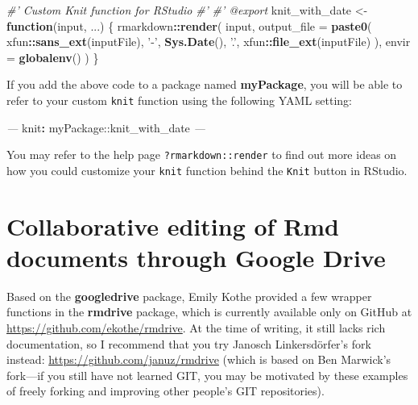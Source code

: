 \documentclass[
  11pt,
]{krantz}
\newenvironment{Shaded}{\begin{snugshade}}{\end{snugshade}}
\newcommand{\AttributeTok}[1]{\textcolor[rgb]{0.61,0.61,0.61}{#1}}
\newcommand{\CommentTok}[1]{\textcolor[rgb]{0.37,0.37,0.37}{\textit{#1}}}
\newcommand{\ControlFlowTok}[1]{\textcolor[rgb]{0.27,0.27,0.27}{\textbf{#1}}}
\newcommand{\DataTypeTok}[1]{\textcolor[rgb]{0.27,0.27,0.27}{#1}}
\newcommand{\FunctionTok}[1]{\textcolor[rgb]{0,0,0}{#1}}
\newcommand{\KeywordTok}[1]{\textcolor[rgb]{0.27,0.27,0.27}{\textbf{#1}}}
\newcommand{\NormalTok}[1]{#1}
\newcommand{\OperatorTok}[1]{\textcolor[rgb]{0.43,0.43,0.43}{\textbf{#1}}}
\newcommand{\PreprocessorTok}[1]{\textcolor[rgb]{0.37,0.37,0.37}{\textit{#1}}}
\newcommand{\StringTok}[1]{\textcolor[rgb]{0.5,0.5,0.5}{#1}}
\begin{document}
\begin{Shaded}
\begin{Highlighting}[]
\CommentTok{#' Custom Knit function for RStudio}
\CommentTok{#'}
\CommentTok{#' @export}
\NormalTok{knit_with_date <-}\StringTok{ }\ControlFlowTok{function}\NormalTok{(input, ...) \{}
\NormalTok{  rmarkdown}\OperatorTok{::}\KeywordTok{render}\NormalTok{(}
\NormalTok{    input,}
    \DataTypeTok{output_file =} \KeywordTok{paste0}\NormalTok{(}
\NormalTok{        xfun}\OperatorTok{::}\KeywordTok{sans_ext}\NormalTok{(inputFile), }\StringTok{'-'}\NormalTok{, }\KeywordTok{Sys.Date}\NormalTok{(), }\StringTok{'.'}\NormalTok{,}
\NormalTok{        xfun}\OperatorTok{::}\KeywordTok{file_ext}\NormalTok{(inputFile)}
\NormalTok{    ),}
    \DataTypeTok{envir =} \KeywordTok{globalenv}\NormalTok{()}
\NormalTok{  )}
\NormalTok{\}}
\end{Highlighting}
\end{Shaded}

If you add the above code to a package named \textbf{myPackage}, you will be able to refer to your custom \texttt{knit} function using the following YAML setting:

\begin{Shaded}
\begin{Highlighting}[]
\PreprocessorTok{---}
\FunctionTok{knit}\KeywordTok{:}\AttributeTok{ myPackage::knit_with_date}
\PreprocessorTok{---}
\end{Highlighting}
\end{Shaded}

You may refer to the help page \texttt{?rmarkdown::render} to find out more ideas on how you could customize your \texttt{knit} function behind the \texttt{Knit} button in RStudio.

\hypertarget{google-drive}{%
\section{Collaborative editing of Rmd documents through Google Drive}\label{google-drive}}

Based on the \textbf{googledrive} package, Emily Kothe provided a few wrapper functions in the \textbf{rmdrive} package, which is currently available only on GitHub at \url{https://github.com/ekothe/rmdrive}. At the time of writing, it still lacks rich documentation, so I recommend that you try Janosch Linkersdörfer's fork instead: \url{https://github.com/januz/rmdrive} (which is based on Ben Marwick's fork---if you still have not learned GIT, you may be motivated by these examples of freely forking and improving other people's GIT repositories).
\end{document}
